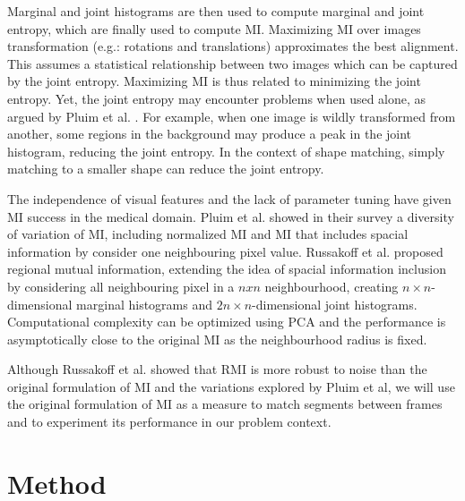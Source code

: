 \documentclass{article}
\begin{document}
Marginal and joint histograms are then used to compute marginal and joint entropy, which are finally used to compute MI. Maximizing MI over images transformation (e.g.: rotations and translations) approximates the best alignment. This assumes a statistical relationship between two images which can be captured by the joint entropy. Maximizing MI is thus related to minimizing the joint entropy. Yet, the joint entropy may encounter problems when used alone, as argued by Pluim et al. \cite{mi}. For example, when one image is wildly transformed from another, some regions in the background may produce a peak in the joint histogram, reducing the joint entropy. In the context of shape matching, simply matching to a smaller shape can reduce the joint entropy.

The independence of visual features and the lack of parameter tuning have given MI success in the medical domain. Pluim et al. \cite{mi} showed in their survey a diversity of variation of MI, including normalized MI and MI that includes spacial information by consider one neighbouring pixel value. Russakoff et al. \cite{rmi} proposed regional mutual information, extending the idea of spacial information inclusion by considering all neighbouring pixel in a $nxn$ neighbourhood, creating $n\times n$-dimensional marginal histograms and $2n\times n$-dimensional joint histograms. Computational complexity can be optimized using PCA and the performance is asymptotically close to the original MI as the neighbourhood radius is fixed. 

Although Russakoff et al. showed that RMI is more robust to noise than the original formulation of MI and the variations explored by Pluim et al, we will use the original formulation of MI as a measure to match segments between frames and to experiment its performance in our problem context. 

\section{Method}
\end{document}
